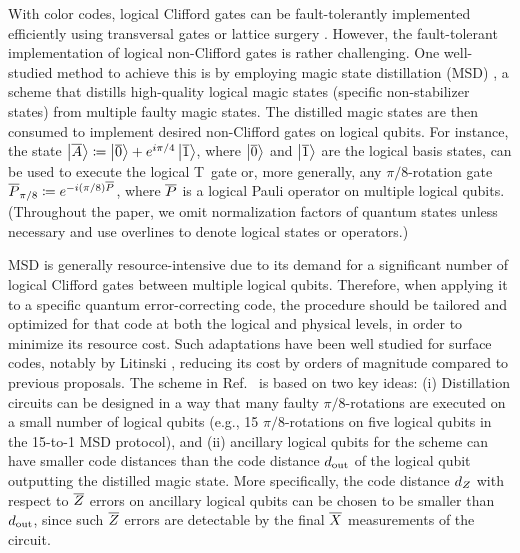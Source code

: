 \documentclass[
 prx,
 reprint,
 superscriptaddress,
 longbibliography,
 dvipsnames
]{revtex4-2}
\begin{document}
With color codes, logical Clifford gates can be fault-tolerantly implemented efficiently using transversal gates \cite{bombin2006topological,kubica2015universal} or lattice surgery \cite{landahl2014quantum,kesselring2022anyon,thomsen2024low}. 
However, the fault-tolerant implementation of logical non-Clifford gates is rather challenging. 
One well-studied method to achieve this is by employing magic state distillation (MSD) \cite{bravyi2005universal,reichardt2005quantum,meier2012magic,fowler2012surface,bravyi2012magic,ogorman2017quantum,beverland2021cost}, a scheme that distills high-quality logical magic states (specific non-stabilizer states) from multiple faulty magic states. 
The distilled magic states are then consumed to implement desired non-Clifford gates on logical qubits. 
For instance, the state $\ket{\overline{A}} \coloneqq \ket{\overline{0}} + e^{i\pi/4}\ket{\overline{1}}$, where $\ket{\overline{0}}$ and $\ket{\overline{1}}$ are the logical basis states, can be used to execute the logical T~gate or, more generally, any $\pi/8$-rotation gate $\overline{P}_{\pi/8} \coloneqq e^{-i(\pi/8)\overline{P}}$, where $\overline{P}$ is a logical Pauli operator on multiple logical qubits.
(Throughout the paper, we omit normalization factors of quantum states unless necessary and use overlines to denote logical states or operators.)

MSD is generally resource-intensive due to its demand for a significant number of logical Clifford gates between multiple logical qubits. 
Therefore, when applying it to a specific quantum error-correcting code, the procedure should be tailored and optimized for that code at both the logical and physical levels, in order to minimize its resource cost.
Such adaptations have been well studied for surface codes, notably by Litinski \cite{litinski2019magic}, reducing its cost by orders of magnitude compared to previous proposals.
The scheme in Ref.~\cite{litinski2019magic} is based on two key ideas: 
(i) Distillation circuits can be designed in a way that many faulty $\pi/8$-rotations are executed on a small number of logical qubits (e.g., 15 $\pi/8$-rotations on five logical qubits in the 15-to-1 MSD protocol), and (ii) ancillary logical qubits for the scheme can have smaller code distances than the code distance $d_{\mathrm{out}}$ of the logical qubit outputting the distilled magic state. 
More specifically, the code distance ${d_Z}$ with respect to $\overline{Z}$ errors on ancillary logical qubits can be chosen to be smaller than $d_{\mathrm{out}}$, since such $\overline{Z}$ errors are detectable by the final $\overline{X}$ measurements of the circuit. 
\end{document}
